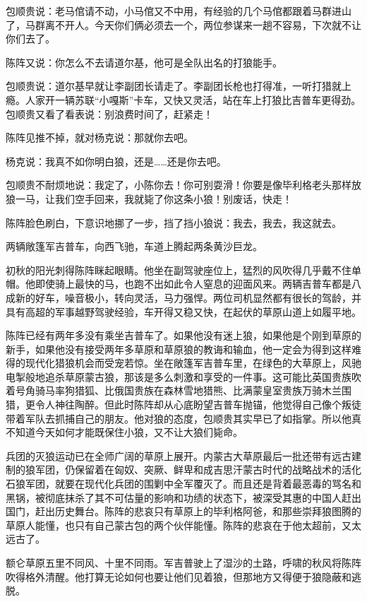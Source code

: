 \par 包顺贵说：老马倌请不动，小马倌又不中用，有经验的几个马倌都跟着马群进山了，马群离不开人。今天你们俩必须去一个，两位参谋来一趟不容易，下次就不让你们去了。
\par 陈阵又说：你怎么不去请道尔基，他可是全队出名的打狼能手。
\par 包顺贵说：道尔基早就让李副团长请走了。李副团长枪也打得准，一听打猎就上瘾。人家开一辆苏联“小嘎斯”卡车，又快又灵活，站在车上打狼比吉普车更得劲。包顺贵又看了看表说：别浪费时间了，赶紧走！
\par 陈阵见推不掉，就对杨克说：那就你去吧。
\par 杨克说：我真不如你明白狼，还是……还是你去吧。
\par 包顺贵不耐烦地说：我定了，小陈你去！你可别耍滑！你要是像毕利格老头那样放狼一马，让我们空手回来，我就毙了你这条小狼！别废话，快走！
\par 陈阵脸色刷白，下意识地挪了一步，挡了挡小狼说：我去，我去，我这就去。
\par 
\par 两辆敞篷军吉普车，向西飞驰，车道上腾起两条黄沙巨龙。
\par 初秋的阳光刺得陈阵眯起眼睛。他坐在副驾驶座位上，猛烈的风吹得几乎戴不住单帽。他即使骑上最快的马，也跑不出如此令人窒息的迎面风来。两辆吉普车都是八成新的好车，噪音极小，转向灵活，马力强悍。两位司机显然都有很长的驾龄，并具有高超的军事越野驾驶经验，车开得又稳又快，在起伏的草原山道上如履平地。
\par 陈阵已经有两年多没有乘坐吉普车了。如果他没有迷上狼，如果他是个刚到草原的新手，如果他没有接受两年多草原和草原狼的教诲和输血，他一定会为得到这样难得的现代化猎狼机会而受宠若惊。坐在敞篷军吉普车里，在绿色的大草原上，风驰电掣般地追杀草原蒙古狼，那该是多么刺激和享受的一件事。这可能比英国贵族吹着号角骑马率狗猎狐、比俄国贵族在森林雪地猎熊、比满蒙皇室贵族万骑木兰围猎，更令人神往陶醉。但此时陈阵却从心底盼望吉普车抛锚，他觉得自己像个叛徒带着军队去抓捕自己的朋友。他对狼的态度，包顺贵其实早已了如指掌。所以他真不知道今天如何才能既保住小狼，又不让大狼们毙命。
\par 兵团的灭狼运动已在全师广阔的草原上展开。内蒙古大草原最后一批还带有远古建制的狼军团，仍保留着在匈奴、突厥、鲜卑和成吉思汗蒙古时代的战略战术的活化石狼军团，就要在现代化兵团的围剿中全军覆灭了。而且还是背着最恶毒的骂名和黑锅，被彻底抹杀了其不可估量的影响和功绩的状态下，被深受其惠的中国人赶出国门，赶出历史舞台。陈阵的悲哀只有草原上的毕利格阿爸，和那些崇拜狼图腾的草原人能懂，也只有自己蒙古包的两个伙伴能懂。陈阵的悲哀在于他太超前，又太远古了。
\par 额仑草原五里不同风、十里不同雨。军吉普驶上了湿沙的土路，呼啸的秋风将陈阵吹得格外清醒。他打算无论如何也要让他们见着狼，但那地方又得便于狼隐蔽和逃脱。
